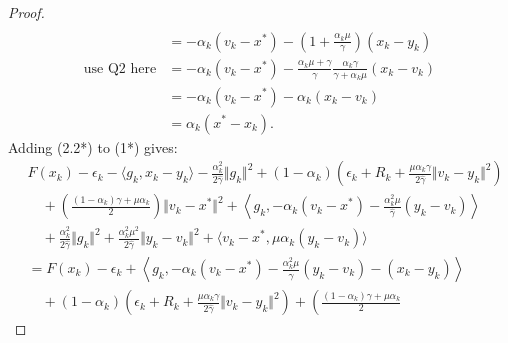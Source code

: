 \documentclass[12pt]{article}
\begin{document}
\begin{proof}
\begin{align*}
            \\
            &= 
            -\alpha_k(v_k - x^*) -
            \left(
                1 + \frac{\alpha_k \mu}{\gamma}
            \right)(x_k - y_k)
            \\
            \text{use Q2 here}
            &= 
            -\alpha_k(v_k - x^*) - 
            \frac{\alpha_k \mu + \gamma}{\gamma}
            \frac{\alpha_k \gamma}{\gamma + \alpha_k \mu}(x_k - v_k)
            \\
            &= 
            -\alpha_k(v_k - x^*)
            - \alpha_k(x_k - v_k)
            \\
            &= \alpha_k(x^* - x_k). 
        \tag{Q3}
        \end{align*}
        Adding (2.2*) to (1*) gives: 
        \begin{align*}
            &
            F(x_k) - \epsilon_k - \langle  g_k, x_k - y_k\rangle
            - \frac{\alpha_k^2}{2\hat \gamma}\Vert g_k\Vert^2
            + (1 - \alpha_k)
            \left(
                \epsilon_k + R_k + 
                \frac{\mu\alpha_k\gamma}{2\hat \gamma}
                \Vert v_k - y_k\Vert^2
            \right)
            \\
            &\quad 
                + 
                \left(
                \frac{(1 - \alpha_k)\gamma + \mu \alpha_k}{2} 
                \right)\Vert v_k - x^*\Vert^2
                + 
                \left\langle g_k, 
                    - \alpha_k(v_k - x^*) 
                    - \frac{\alpha_k^2\mu}{\hat \gamma}(y_k - v_k)
                \right\rangle
            \\
            & \quad 
                + \frac{\alpha_k^2}{2\hat \gamma}\Vert g_k\Vert^2
                + \frac{\alpha_k^2 \mu^2}{2\hat \gamma}\Vert y_k - v_k\Vert^2
                + \langle v_k - x^*, \mu\alpha_k(y_k - v_k)\rangle
            \\
            &= 
            F(x_k) - \epsilon_k 
            + \left\langle 
                g_k, 
                - \alpha_k(v_k - x^*) 
                - \frac{\alpha_k^2\mu}{\hat \gamma}(y_k - v_k)
                - (x_k - y_k)
            \right\rangle
            \\
            &\quad 
                + (1 - \alpha_k)
                \left(
                    \epsilon_k + R_k + 
                    \frac{\mu\alpha_k\gamma}{2\hat \gamma}
                    \Vert v_k - y_k\Vert^2
                \right)
                + 
                \left(
                \frac{(1 - \alpha_k)\gamma + \mu \alpha_k}{2} 

\end{align*}
\end{proof}
\end{document}

